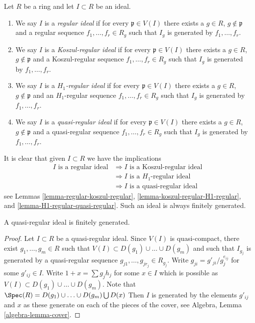 \begin{definition}
\label{definition-regular-ideal}
Let $R$ be a ring and let $I \subset R$ be an ideal.
\begin{enumerate}
\item We say $I$ is a {\it regular ideal} if for every
$\mathfrak p \in V(I)$ there exists a $g \in R$, $g \not \in \mathfrak p$
and a regular sequence $f_1, \ldots, f_r \in R_g$ such that $I_g$
is generated by $f_1, \ldots, f_r$.
\item We say $I$ is a {\it Koszul-regular ideal} if for every
$\mathfrak p \in V(I)$ there exists a $g \in R$, $g \not \in \mathfrak p$
and a Koszul-regular sequence $f_1, \ldots, f_r \in R_g$ such that $I_g$
is generated by $f_1, \ldots, f_r$.
\item We say $I$ is a {\it $H_1$-regular ideal} if for every
$\mathfrak p \in V(I)$ there exists a $g \in R$, $g \not \in \mathfrak p$
and an $H_1$-regular sequence $f_1, \ldots, f_r \in R_g$ such that $I_g$
is generated by $f_1, \ldots, f_r$.
\item We say $I$ is a {\it quasi-regular ideal} if for every
$\mathfrak p \in V(I)$ there exists a $g \in R$, $g \not \in \mathfrak p$
and a quasi-regular sequence $f_1, \ldots, f_r \in R_g$ such that $I_g$
is generated by $f_1, \ldots, f_r$.
\end{enumerate}
\end{definition}

\noindent
It is clear that given $I \subset R$ we have the implications
\begin{align*}
I\text{ is a regular ideal}
& \Rightarrow
I\text{ is a Koszul-regular ideal} \\
& \Rightarrow
I\text{ is a }H_1\text{-regular ideal} \\
& \Rightarrow
I\text{ is a quasi-regular ideal}
\end{align*}
see Lemmas \ref{lemma-regular-koszul-regular},
\ref{lemma-koszul-regular-H1-regular}, and
\ref{lemma-H1-regular-quasi-regular}. Such an ideal is always finitely
generated.

\begin{lemma}
\label{lemma-quasi-regular-ideal-finite}
A quasi-regular ideal is finitely generated.
\end{lemma}

\begin{proof}
Let $I \subset R$ be a quasi-regular ideal. Since $V(I)$ is quasi-compact,
there exist $g_1, \ldots, g_m \in R$ such that
$V(I) \subset D(g_1) \cup \ldots \cup D(g_m)$
and such that $I_{g_j}$ is generated by a quasi-regular sequence
$g_{j1}, \ldots, g_{jr_j} \in R_{g_j}$. Write $g_{ji} = g'_{ji}/g_j^{e_{ij}}$
for some $g'_{ij} \in I$. Write $1 + x = \sum g_j h_j$
for some $x \in I$ which is possible as
$V(I) \subset D(g_1) \cup \ldots \cup D(g_m)$.
Note that $\Spec(R) = D(g_1) \cup \ldots \cup D(g_m) \bigcup D(x)$
Then $I$ is generated by the elements $g'_{ij}$ and $x$ as
these generate on each of the pieces of the cover, see
Algebra, Lemma \ref{algebra-lemma-cover}.
\end{proof}

